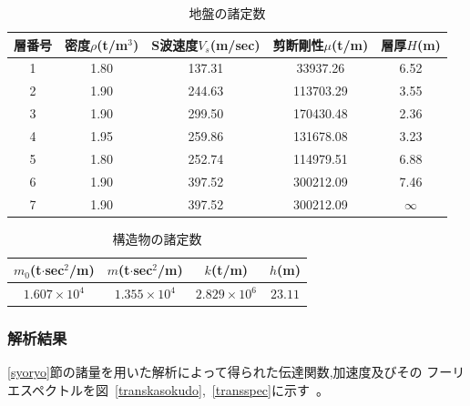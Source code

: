 \documentclass[titlepage]{jsarticle}
\begin{document}
\begin{table}\begin{center}
\caption{地盤の諸定数}\label{jibansyoryou}
\begin{tabular}{c|c|c|c|c} \hline
層番号 & 密度$\rho $(t/m$^3$) & S波速度$V_s$(m/sec) & 剪断剛性$\mu $(t/m) & 層厚$H$(m) 
\\ \hline
1 & 1.80 & 137.31 &  33937.26 & 6.52 \\ \hline
2 & 1.90 & 244.63 & 113703.29 & 3.55 \\ \hline
3 & 1.90 & 299.50 & 170430.48 & 2.36 \\ \hline
4 & 1.95 & 259.86 & 131678.08 & 3.23 \\ \hline
5 & 1.80 & 252.74 & 114979.51 & 6.88 \\ \hline
6 & 1.90 & 397.52 & 300212.09 & 7.46 \\ \hline
7 & 1.90 & 397.52 & 300212.09 & $\infty $ \\ \hline
\end{tabular}\end{center}
\end{table}
%
\begin{table}\begin{center}
\caption{構造物の諸定数}\label{kouzousyoryou}
\begin{tabular}{c|c|c|c} \hline
$m_0$(t$\cdot $sec$^2$/m) & $m$(t$\cdot $sec$^2$/m) & $k$(t/m) & $h$(m) \\ \hline
$1.607\times 10^4$ & $1.355\times 10^4$ & $2.829\times 10^6$ & $23.11$ \\ \hline
\end{tabular}\end{center}
\end{table}

\subsubsection{解析結果}
\ref{syoryo}節の諸量を用いた解析によって得られた伝達関数,加速度及びその
フーリエスペクトルを図~\ref{transkasokudo},~\ref{transspec}に示す~\cite{osaki}。
\end{document}

